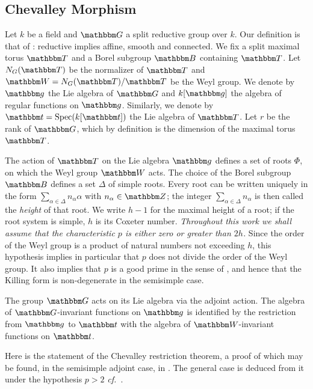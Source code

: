 \documentclass[12pt,english]{smfart}
\numberwithin{equation}{subsection}
\theoremstyle{remark}
\newcommand\ZZ{{\mathbbm Z}}
\newcommand\bbB{{\mathbbm B}}
\newcommand\bbW{{\mathbbm W}}
\newcommand\bbT{{\mathbbm T}}
\newcommand\bbG{{\mathbbm G}}
\newcommand\bbg{{\mathbbm g}}
\newcommand\bbt{{\mathbbm t}}
\newcommand\Spec{{\rm Spec}}
\newcommand\cf{{\it cf.\ }}
\begin{document}
\subsection{Chevalley Morphism}
\label{subsection : Chevalley}

Let $k$ be a field and $\bbG$ a split reductive group over $k$. Our definition is that of \cite{SGA3}: reductive implies affine, smooth and connected. We fix a split maximal torus $\bbT$ and a Borel subgroup $\bbB$ containing $\bbT$. Let $N_G(\bbT)$ be the normalizer of $\bbT$ and $\bbW=N_G(\bbT)/\bbT$ be the Weyl group. We denote by $\bbg$ the Lie algebra of $\bbG$ and $k[\bbg]$
the algebra of regular functions on $\bbg$. Similarly, we denote by
$\bbt=\Spec(k[\bbt])$ the Lie algebra of $\bbT$. Let $r$ be the rank of
$\bbG$, which by definition is the dimension of the maximal torus $\bbT$.

The action of $\bbT$ on the Lie algebra $\bbg$ defines a set of roots $\Phi$, on which the Weyl group $\bbW$ acts. The choice of the Borel subgroup $\bbB$ defines a set $\Delta$ of simple roots. Every root can be written uniquely in the form $\sum_{\alpha\in\Delta}n_\alpha\alpha$ with $n_\alpha\in\ZZ$; the integer $\sum_{\alpha\in\Delta}n_\alpha$ is then called the {\em height} of that root. We write $h-1$ for the maximal height of a root; if the root system is simple, $h$ is its Coxeter number. {\em Throughout this work we shall assume that the characteristic $p$ is either zero or greater than $2h$.} Since the order of the Weyl group is a product of natural numbers not exceeding $h$, this hypothesis implies in particular that $p$ does not divide the order of the Weyl group. It also implies that $p$ is a good prime in the sense of \cite[1.14]{Ca}, and hence that the Killing form is non-degenerate in the semisimple case.

The group $\bbG$ acts on its Lie algebra via the adjoint action. The algebra of $\bbG$-invariant functions on $\bbg$ is identified by the restriction from $\bbg$ to $\bbt$ with the algebra of
$\bbW$-invariant functions on $\bbt$.

Here is the statement of the Chevalley restriction theorem, a proof of which may be found, in the semisimple adjoint case, in \cite[3.17]{S-S}. The general case is deduced from it under the hypothesis $p>2$ \cf \cite[0.8]{Levy}.
\end{document}
